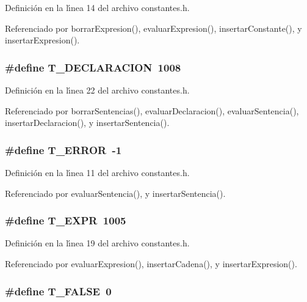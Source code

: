 Definici\'{o}n en la l\'{\i}nea 14 del archivo constantes.h.

Referenciado por borrar\-Expresion(), evaluar\-Expresion(), insertar\-Constante(), y insertar\-Expresion().
\subsubsection{\setlength{\rightskip}{0pt plus 5cm}\#define T\_\-DECLARACION~1008}\label{constantes_8h_a11}




Definici\'{o}n en la l\'{\i}nea 22 del archivo constantes.h.

Referenciado por borrar\-Sentencias(), evaluar\-Declaracion(), evaluar\-Sentencia(), insertar\-Declaracion(), y insertar\-Sentencia().
\subsubsection{\setlength{\rightskip}{0pt plus 5cm}\#define T\_\-ERROR~-1}\label{constantes_8h_a0}




Definici\'{o}n en la l\'{\i}nea 11 del archivo constantes.h.

Referenciado por evaluar\-Sentencia(), y insertar\-Sentencia().
\subsubsection{\setlength{\rightskip}{0pt plus 5cm}\#define T\_\-EXPR~1005}\label{constantes_8h_a8}




Definici\'{o}n en la l\'{\i}nea 19 del archivo constantes.h.

Referenciado por evaluar\-Expresion(), insertar\-Cadena(), y insertar\-Expresion().
\subsubsection{\setlength{\rightskip}{0pt plus 5cm}\#define T\_\-FALSE~0}\label{constantes_8h_a1}




